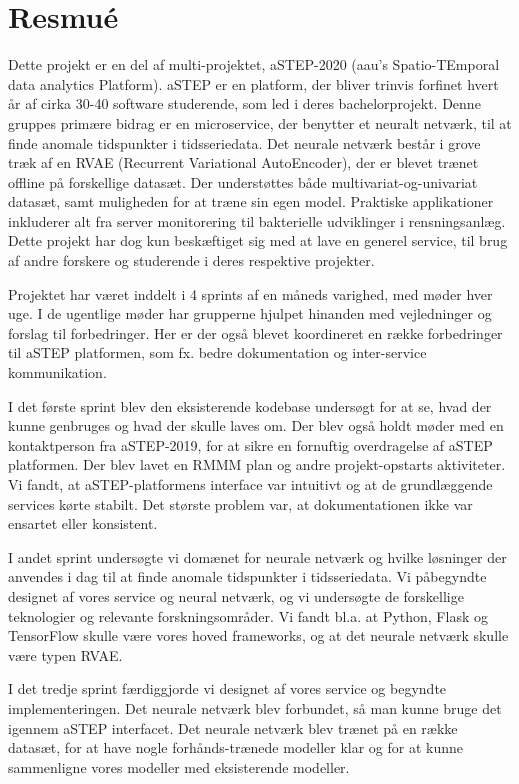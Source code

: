 \chapter*{Resmué}
Dette projekt er en del af multi-projektet, aSTEP-2020 (aau's Spatio-TEmporal data analytics Platform). aSTEP er en platform, der bliver trinvis forfinet hvert år af cirka 30-40 software studerende, som led i deres bachelorprojekt. 
Denne gruppes primære bidrag er en microservice, der benytter et neuralt netværk, til at finde anomale tidspunkter i tidsseriedata. Det neurale netværk består i grove træk af en RVAE (Recurrent Variational AutoEncoder), der er blevet trænet offline på forskellige datasæt. Der understøttes både multivariat-og-univariat datasæt, samt muligheden for at træne sin egen model. Praktiske applikationer inkluderer alt fra server monitorering til bakterielle udviklinger i rensningsanlæg. Dette projekt har dog kun beskæftiget sig med at lave en generel service, til brug af andre forskere og studerende i deres respektive projekter. 

Projektet har været inddelt i 4 sprints af en måneds varighed, med møder hver uge. I de ugentlige møder har grupperne hjulpet hinanden med vejledninger og forslag til forbedringer. Her er der også blevet koordineret en række forbedringer til aSTEP platformen, som fx. bedre dokumentation og inter-service kommunikation.

I det første sprint blev den eksisterende kodebase undersøgt for at se, hvad der kunne genbruges og hvad der skulle laves om. Der blev også holdt møder med en kontaktperson fra aSTEP-2019, for at sikre en fornuftig overdragelse af aSTEP platformen. Der blev lavet en RMMM plan og andre projekt-opstarts aktiviteter. Vi fandt, at aSTEP-platformens interface var intuitivt og at de grundlæggende services kørte stabilt. Det største problem var, at dokumentationen ikke var ensartet eller konsistent.
 
I andet sprint undersøgte vi domænet for neurale netværk og hvilke løsninger der anvendes i dag til at finde anomale tidspunkter i tidsseriedata. Vi påbegyndte designet af vores service og neural netværk, og vi undersøgte de forskellige teknologier og relevante forskningsområder. Vi fandt bl.a. at Python, Flask og TensorFlow skulle være vores hoved frameworks, og at det neurale netværk skulle være typen RVAE.

I det tredje sprint færdiggjorde vi designet af vores service og begyndte implementeringen. Det neurale netværk blev forbundet, så man kunne bruge det igennem aSTEP interfacet. Det neurale netværk blev trænet på en række datasæt, for at have nogle forhånds-trænede modeller klar og for at kunne sammenligne vores modeller med eksisterende modeller.

